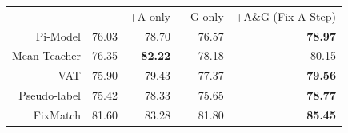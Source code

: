\begin{tabular}{r | r | r | r | r}
             & ~~~~ & +A only & +G only & +A\&G (Fix-A-Step)
\\ 
    Pi-Model & 76.03 & 78.70 & 76.57 & \textbf{78.97} 
\\ 
    Mean-Teacher & 76.35 & \textbf{82.22} & 78.18 & 80.15
\\ 
    VAT & 75.90 & 79.43 & 77.37 & \textbf{79.56}
\\
    Pseudo-label & 75.42 & 78.33 & 75.65 & \textbf{78.77}
\\
    FixMatch & 81.60 & 83.28 & 81.80 & \textbf{85.45}
\end{tabular}